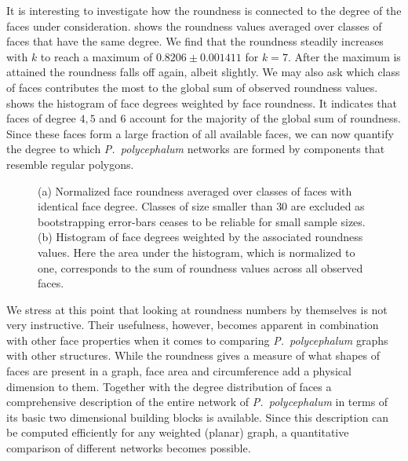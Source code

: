 		It is interesting to investigate how the roundness is connected to the degree of the faces under consideration.  shows the roundness values averaged over classes of faces that have the same degree. We find that the roundness steadily increases with $k$ to reach a maximum of $0.8206 \pm 0.001411$ for $k=7$. After the maximum is attained the roundness falls off again, albeit slightly. We may also ask which class of faces contributes the most to the global sum of observed roundness values.  shows the histogram of face degrees weighted by face roundness. It indicates that faces of degree  $4,5$ and $6$ account for the majority of the global sum of roundness. Since these faces form a large fraction of all available faces, we can now quantify the degree to which \emph{P.~polycephalum} networks are formed by components that resemble regular polygons.

		\begin{figure}
			\centering

			\caption[Average face roundness per face type.]{(a) Normalized face roundness averaged over classes of faces with identical face degree. Classes of size smaller than $30$ are excluded as bootstrapping error-bars ceases to be reliable for small sample sizes. (b) Histogram of face degrees weighted by the associated roundness values. Here the area under the histogram, which is normalized to one, corresponds to the sum of roundness values across all observed faces.}
		\end{figure}

		We stress at this point that looking at roundness numbers by themselves is not very instructive. Their usefulness, however, becomes apparent in combination with other face properties when it comes to comparing \emph{P.~polycephalum} graphs with other structures. While the roundness gives a measure of what shapes of faces are present in a graph, face area and circumference add a physical dimension to them. Together with the degree distribution of faces a comprehensive description of the entire network of \emph{P.~polycephalum} in terms of its basic two dimensional building blocks is available. Since this description can be computed efficiently for any weighted (planar) graph, a quantitative comparison of different networks becomes possible.

